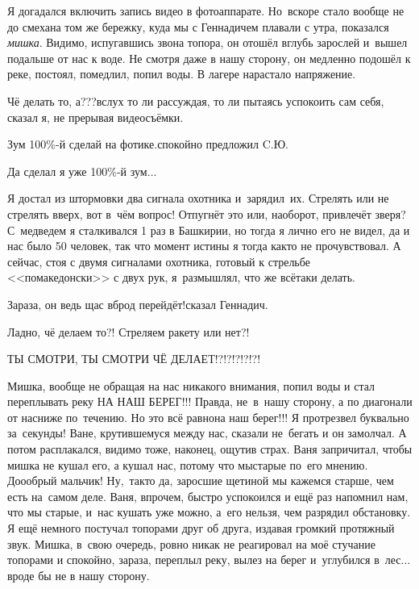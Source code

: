 Я догадался включить запись видео в фотоаппарате. Но~вскоре стало вообще не до смеха\mdash на том же бережку, куда мы с Геннадичем плавали с утра, показался \textit{мишка}. Видимо, испугавшись звона топора, он отошёл вглубь зарослей и~вышел подальше от нас к воде. Не смотря даже в нашу сторону, он медленно подошёл к реке, постоял, помедлил, попил воды. В лагере нарастало напряжение. 

\diagdash Чё делать то, а???\mdash вслух то ли рассуждая, то ли пытаясь успокоить сам себя, сказал я, не прерывая видеосъёмки.

\diagdash Зум 100\%-й сделай на фотике.\mdash спокойно предложил C.Ю.

\diagdash Да сделал я уже 100\%-й зум$\ldots$

Я достал из штормовки два сигнала охотника и~зарядил~их. Стрелять или не стрелять вверх, вот в~чём вопрос! Отпугнёт это или, наоборот, привлечёт зверя? С~медведем я сталкивался 1 раз в Башкирии, но тогда я лично его не видел, да и нас было 50 человек, так что момент истины я тогда как\sdash то не прочувствовал. А сейчас, стоя с двумя сигналами охотника, готовый к стрельбе <<по\sdash македонски>> с двух рук, я~размышлял, что же всё\sdash таки делать. 

\diagdash Зараза, он ведь щас вброд перейдёт!\mdash сказал Геннадич.

\diagdash Ладно, чё делаем то?! Стреляем ракету или нет?!

\diagdash ТЫ СМОТРИ, ТЫ СМОТРИ ЧЁ ДЕЛАЕТ!?!?!?!?!?!

Мишка, вообще не обращая на нас никакого внимания, попил воды и стал переплывать реку НА НАШ БЕРЕГ!!! Правда, не~в~нашу сторону, а по диагонали от нас\mdash ниже по~течению. Но это всё равно\mdash на наш берег!!! Я протрезвел буквально за~секунды! Ване, крутившемуся между нас, сказали не~бегать и он замолчал. А потом расплакался, видимо тоже, наконец, ощутив страх. Ваня запричитал, чтобы мишка не кушал его, а кушал нас, потому что мы\mdash старые по~его мнению. До\sdash о\sdash о\sdash брый мальчик! Ну,~так\sdash то да, заросшие щетиной мы кажемся старше, чем есть на~самом деле. Ваня, впрочем, быстро успокоился и ещё раз напомнил нам, что мы старые, и~нас кушать уже можно, а~его нельзя, чем разрядил обстановку. Я ещё немного постучал топорами друг об друга, издавая громкий протяжный звук. Мишка, в~свою очередь, ровно никак не реагировал на моё стучание топорами и спокойно, зараза, переплыл реку, вылез на берег и~углубился в~лес$\ldots$ вроде бы не в нашу сторону. 

